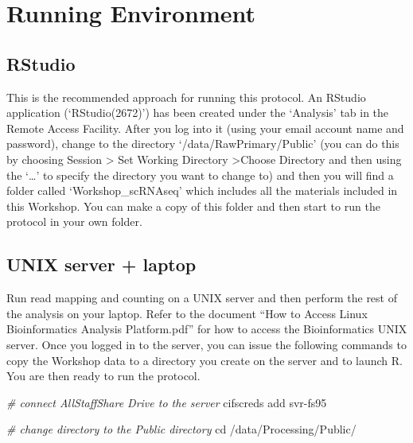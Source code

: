 \documentclass[
  openany]{book}
\newenvironment{Shaded}{\begin{snugshade}}{\end{snugshade}}
\newcommand{\BuiltInTok}[1]{#1}
\newcommand{\CommentTok}[1]{\textcolor[rgb]{0.56,0.35,0.01}{\textit{#1}}}
\newcommand{\ExtensionTok}[1]{#1}
\newcommand{\NormalTok}[1]{#1}
\begin{document}
\hypertarget{running-environment}{%
\chapter{Running Environment}\label{running-environment}}

\hypertarget{rstudio}{%
\section{RStudio}\label{rstudio}}

This is the recommended approach for running this protocol. An RStudio application (`RStudio(2672)') has been created under the `Analysis' tab in the Remote Access Facility. After you log into it (using your email account name and password), change to the directory `/data/RawPrimary/Public' (you can do this by choosing Session \textgreater{} Set Working Directory \textgreater Choose Directory and then using the `\ldots{}' to specify the directory you want to change to) and then you will find a folder called `Workshop\_scRNAseq' which includes all the materials included in this Workshop. You can make a copy of this folder and then start to run the protocol in your own folder.

\hypertarget{setup}{%
\section{UNIX server + laptop}\label{setup}}

Run read mapping and counting on a UNIX server and then perform the rest of the analysis on your laptop. Refer to the document ``How to Access Linux Bioinformatics Analysis Platform.pdf'' for how to access the Bioinformatics UNIX server. Once you logged in to the server, you can issue the following commands to copy the Workshop data to a directory you create on the server and to launch R. You are then ready to run the protocol.

\begin{Shaded}
\begin{Highlighting}[]
\CommentTok{\# connect AllStaffShare Drive to the server}
\ExtensionTok{cifscreds}\NormalTok{ add svr{-}fs95}
\end{Highlighting}
\end{Shaded}

\begin{Shaded}
\begin{Highlighting}[]
\CommentTok{\# change directory to the Public directory}
\BuiltInTok{cd}\NormalTok{ /data/Processing/Public/}
\end{Highlighting}
\end{Shaded}
\end{document}
